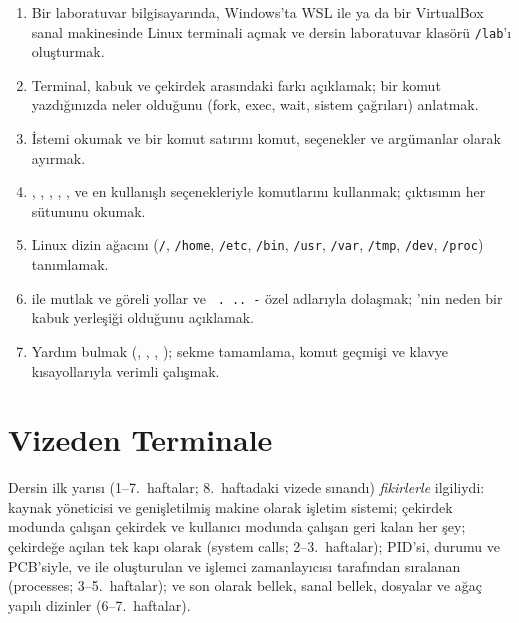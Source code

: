 \vspace{0.8em}
\begin{keyidea}
\begin{enumerate}[leftmargin=1.4em]
  \item Bir laboratuvar bilgisayarında, Windows'ta WSL ile ya da bir VirtualBox sanal makinesinde Linux terminali açmak ve dersin laboratuvar klasörü \texttt{\tl/lab}'ı oluşturmak.
  \item Terminal, kabuk ve çekirdek arasındaki farkı açıklamak; bir komut yazdığınızda neler olduğunu (fork, exec, wait, sistem çağrıları) anlatmak.
  \item İstemi okumak ve bir komut satırını komut, seçenekler ve argümanlar olarak ayırmak.
  \item {}, , , , ,  ve en kullanışlı seçenekleriyle  komutlarını kullanmak;  çıktısının her sütununu okumak.
  \item Linux dizin ağacını (\texttt{/}, \texttt{/home}, \texttt{/etc}, \texttt{/bin}, \texttt{/usr}, \texttt{/var}, \texttt{/tmp}, \texttt{/dev}, \texttt{/proc}) tanımlamak.
  \item {} ile mutlak ve göreli yollar ve \texttt{\tl}\ \texttt{.}\ \texttt{..}\ \texttt{-} özel adlarıyla dolaşmak; 'nin neden bir kabuk yerleşiği olduğunu açıklamak.
  \item Yardım bulmak (, , , ); sekme tamamlama, komut geçmişi ve klavye kısayollarıyla verimli çalışmak.
\end{enumerate}
\end{keyidea}

\setcounter{tocdepth}{1}
\tableofcontents

\section{Vizeden Terminale}

Dersin ilk yarısı (1--7.\ haftalar; 8.\ haftadaki vizede sınandı) \emph{fikirlerle} ilgiliydi: kaynak yöneticisi ve genişletilmiş makine olarak işletim sistemi; çekirdek modunda çalışan çekirdek ve kullanıcı modunda çalışan geri kalan her şey; çekirdeğe açılan tek kapı olarak  (system calls; 2--3.\ haftalar); PID'si, durumu ve PCB'siyle,  ve  ile oluşturulan ve işlemci zamanlayıcısı tarafından sıralanan  (processes; 3--5.\ haftalar); ve son olarak bellek, sanal bellek, dosyalar ve ağaç yapılı dizinler (6--7.\ haftalar).

